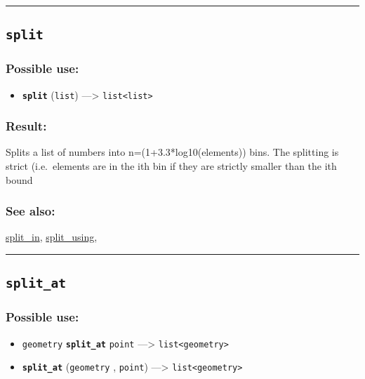 \documentclass[]{book}
\providecommand{\tightlist}{%
  \setlength{\itemsep}{0pt}\setlength{\parskip}{0pt}}
\theoremstyle{definition}
\theoremstyle{definition}
\theoremstyle{definition}
\theoremstyle{remark}
\begin{document}
\begin{center}\rule{0.5\linewidth}{\linethickness}\end{center}

\subsection{\texorpdfstring{\texttt{split}}{split}}\label{split}

\subsubsection{Possible use:}\label{possible-use-491}

\begin{itemize}
\tightlist
\item
  \textbf{\texttt{split}} (\texttt{list}) ---\textgreater{}
  \texttt{list\textless{}list\textgreater{}}
\end{itemize}

\subsubsection{Result:}\label{result-475}

Splits a list of numbers into n=(1+3.3*log10(elements)) bins. The
splitting is strict (i.e.~elements are in the ith bin if they are
strictly smaller than the ith bound

\subsubsection{See also:}\label{see-also-192}

\href{OperatorsSZ\#split_in}{split\_in},
\href{OperatorsSZ\#split_using}{split\_using},

\begin{center}\rule{0.5\linewidth}{\linethickness}\end{center}

\subsection{\texorpdfstring{\texttt{split\_at}}{split\_at}}\label{split_at}

\subsubsection{Possible use:}\label{possible-use-492}

\begin{itemize}
\tightlist
\item
  \texttt{geometry} \textbf{\texttt{split\_at}} \texttt{point}
  ---\textgreater{} \texttt{list\textless{}geometry\textgreater{}}
\item
  \textbf{\texttt{split\_at}} (\texttt{geometry} , \texttt{point})
  ---\textgreater{} \texttt{list\textless{}geometry\textgreater{}}
\end{itemize}
\end{document}
